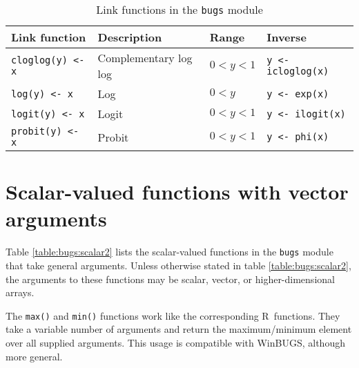 \documentclass[11pt, a4paper, titlepage]{report}
\newcommand{\WinBUGS}{\textsf{WinBUGS}}
\newcommand{\R}{\textsf{R}}
\begin{document}
\begin{table}
\begin{center}
\begin{tabular}{llll}
\hline
Link function         & Description & Range & Inverse \\
\hline
\verb+cloglog(y) <- x+ & Complementary log log & $0 < y < 1$ & \verb+y <- icloglog(x)+ \\
\verb+log(y) <- x+    & Log           & $0 < y$ &  \verb+y <- exp(x)+ \\
\verb+logit(y) <- x+  & Logit         & $0 < y < 1$ &  \verb+y <- ilogit(x)+ \\
\verb+probit(y) <- x+ & Probit        & $0 < y < 1$ &  \verb+y <- phi(x)+\\
\hline
\end{tabular}
\caption{Link functions in the \texttt{bugs} module \label{table:bugs:link}}
\end{center}
\end{table}

\section{Scalar-valued functions with vector arguments}

Table \ref{table:bugs:scalar2} lists the scalar-valued functions in the
\texttt{bugs} module that take general arguments. Unless otherwise
stated in table \ref{table:bugs:scalar2}, the arguments to these functions
may be scalar, vector, or higher-dimensional arrays.

The \verb+max()+ and \verb+min()+ functions work like the
corresponding \R\ functions. They take a variable number of arguments
and return the maximum/minimum element over all supplied
arguments. This usage is  compatible with \WinBUGS, although more general.
\end{document}
